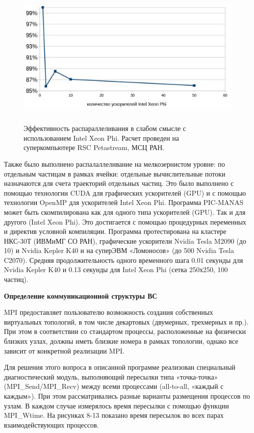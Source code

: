 \begin{figure}[htb]
	\begin{center}
		\includegraphics[height=7cm,keepaspectratio]{images/petastream_phi100.jpg}
	\end{center}
	\caption{Эффективность распараллеливания в слабом смысле с использованием Intel Xeon Phi. Расчет проведен на суперкомпьютере RSC Petastream, МСЦ РАН.}
	\label{phi100}
\end{figure}

Также было выполнено распалаллеливание на мелкозернистом уровне: по отдельным частицам в рамках ячейки: отдельные вычислительные потоки назначаются для счета траекторий отдельных частиц. Это было выполнено с помощью технологии CUDA для графических ускорителей (GPU) и с помощью технологии OpenMP для ускорителей Intel Xeon Phi. Программа PIC-MANAS может быть скомпилирована как для одного типа ускорителей (GPU). Так и для другого (Intel Xeon Phi). Это достигается с помощью процедурных переменных и директив условной компиляции. Программа протестирована на кластере НКС-30Т (ИВМиМГ СО РАН), графические ускорители Nvidia Tesla M2090 (до 10) и Nvidia Kepler K40 и на суперЭВМ «Ломоносов»  (до 500 Nvidia Tesla C2070). Средняя продолжительность одного временного шага 0.01 секунды для  Nvidia Kepler K40 и 0.13 секунды для  Intel Xeon Phi (сетка 250х250, 100 частиц).

\textbf{Определение коммуникационной структуры ВС}

MPI предоставляет пользователю возможность создания собственных виртуальных топологий, в том числе декартовых (двумерных, трехмерных  и пр.). При этом в соответствии со стандартом процессы, расположенные на физически близких узлах, должны иметь близкие номера в рамках топологии, однако все зависит от конкретной реализации MPI.  

Для решения этого вопроса в описанной программе реализован специальный диагностический модуль, выполняющий пересылки типа «точка-точка» (MPI\_Send/MPI\_Recv) между всеми процессами (all-to-all, «каждый с каждым»). При этом рассматривались разные варианты размещения процессов по узлам. В каждом случае измерялось время пересылки с помощью функции MPI\_Wtime. На рисунках 8-13 показано время пересылок во всех парах взаимодействующих процессов.

